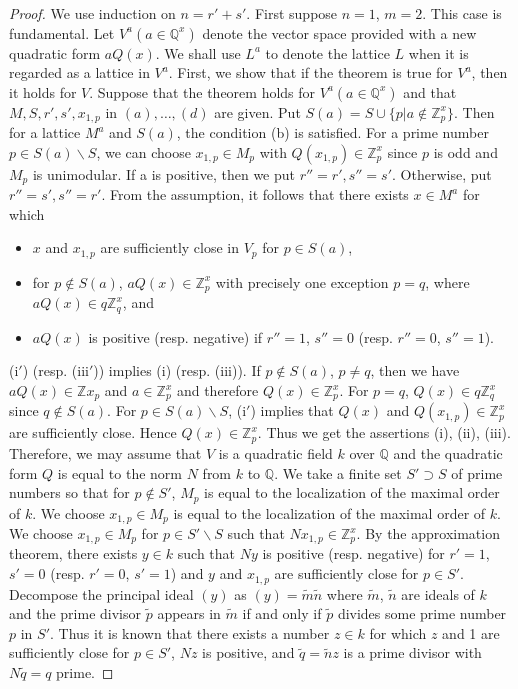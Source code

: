 \begin{proof}
We use induction on $n=r'+s'$. First suppose $n=1$, $m=2$. This case
is fundamental. Let $V^a(a\in \mathbb{Q}^x)$ denote the vector
space provided with a new quadratic form $aQ(x)$. We shall use $L^a$
to denote the lattice $L$ when it is regarded as a lattice in
$V^a$. First, we show that if the theorem is true for $V^a$, then it
holds for $V$. Suppose that the theorem holds for
$V^a(a\in \mathbb{Q}^x)$ and that $M, S, r', s', x_{1,p}$ in
$(a), \ldots, (d)$ are given. Put
$S(a)=S\cup \{p|a \not\in \mathbb{Z}^x_p\}$. Then for a lattice $M^a$
and $S(a)$, the condition (b) is satisfied. For a prime number
$p\in S(a)\backslash S$, we can choose $x_{1,p} \in
M_p$ with $Q(x_{1,p}) \in \mathbb{Z}^x_p$ since $p$ is odd and
$M_p$ is unimodular. If a is positive, then we put $r''=r',
s''=s'$. Otherwise, put $r''=s', s''=r'$. From the assumption, it
follows that there exists $x\in M^a$ for which 
\begin{itemize}
\item[\rm{(i$'$)}] $x$ and $x_{1,p}$ are sufficiently close in $V_p$ for
$p\in S(a)$,

\item[\rm{(ii$'$)}] for $p\not\in S(a)$,
$aQ(x)\in \mathbb{Z}^x_p$ with precisely one exception $p=q$,
where $aQ(x)\in q \mathbb{Z}^x_q$, and

\item[\rm{(iii$'$)}] $aQ(x)$ is \pageoriginale positive (resp. negative)
if $r''=1$, $s''=0$ (resp. $r''=0$, $s''=1$).
\end{itemize}

(i$'$) (resp. (iii$'$)) implies (i) (resp. (iii)). If $p\not\in S(a)$,
$p\neq q$, then we have $aQ(x)\in \mathbb{Z}x_p$ and
$a\in \mathbb{Z}^x_p$ and therefore
$Q(x) \in \mathbb{Z}^x_p$. For $p=q$, $Q(x)\in
q \mathbb{Z}^x_q$ since $q \not\in S(a)$. For $p\in
S(a)\backslash S$, (i$'$) implies that $Q(x)$ and
$Q(x_{1,p}) \in \mathbb{Z}^x_p$ are sufficiently close. Hence
$Q(x)\in \mathbb{Z}^x_p$. Thus we get the assertions (i),
(ii), (iii). Therefore, we may assume that $V$ is a quadratic field
$k$ over $\mathbb{Q}$ and the quadratic form $Q$ is equal to the norm
$N$ from $k$ to $\mathbb{Q}$. We take a finite set $S'\supset S$ of
prime numbers so that for $p\not\in S'$, $M_p$ is equal to the
localization of the maximal order of $k$. We choose
$x_{1,p}\in M_p$ is equal to the localization of the maximal
order of $k$. We choose $x_{1,p}\in M_p$ for $p\in
S'\backslash S$ such that $N x_{1,p} \in \mathbb{Z}^x_p$. By
the approximation theorem, there exists $y\in k$ such that
$Ny$ is positive (resp. negative) for $r'=1$, $s'=0$ (resp. $r'=0$,
$s'=1$) and $y$ and $x_{1,p}$ are sufficiently close for $p\in
S'$. Decompose the principal ideal $(y)$ as
$(y)=\widetilde{m}\widetilde{n}$ where $\widetilde{m}$,
$\widetilde{n}$ are ideals of $k$ and the prime divisor
$\widetilde{p}$ appears in $\widetilde{m}$ if and only if
$\widetilde{p}$ divides some prime number $p$ in $S'$. Thus it is
known that there exists a number $z\in k$ for which $z$ and 1
are sufficiently close for $p\in S'$, $Nz$ is positive, and
$\widetilde{q} =\widetilde{n}z$ is a prime divisor with
$N\widetilde{q}=q$ prime.
\end{proof}

